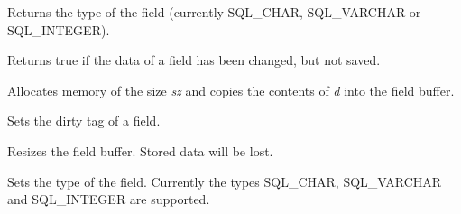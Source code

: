 
Returns the type of the field (currently SQL\_CHAR, SQL\_VARCHAR or SQL\_INTEGER).
 


Returns true if the data of a field has been changed, but not saved.



Allocates memory of the size {\it sz} and copies the contents of {\it d} into the
field buffer.
  


Sets the dirty tag of a field.



Resizes the field buffer. Stored data will be lost.
  


Sets the type of the field. Currently the types SQL\_CHAR, SQL\_VARCHAR and
SQL\_INTEGER are supported.


